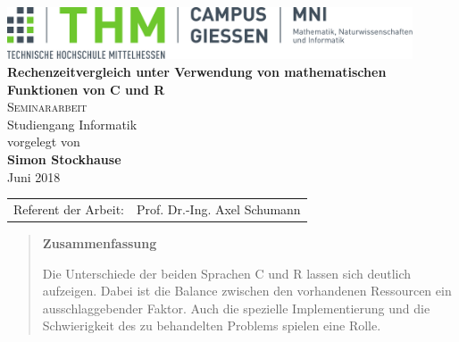 \documentclass[%
	BCOR=8.25mm,         %
	DIV=12,              %
	parskip=half,				 %
	bibliography=totoc,	 %
	headsepline=on,      %
	openany
	]{scrbook}
\begin{document}
\frontmatter

\begin{titlepage}
	\begin{center}
	\includegraphics[width=0.9\textwidth]{img/mni-logo}\\[5cm]
	\textbf{\huge\sffamily Rechenzeitvergleich unter Verwendung von mathematischen Funktionen von C und R}\\[2cm]
	\textsc{\Large Seminararbeit}\\Studiengang Informatik\\[2cm]
	vorgelegt von\\
	\textbf{Simon Stockhause}\\ [1.5cm] 
	Juni 2018
	\end{center}
	\vfill
	\begin{tabular}{ll}
		Referent der Arbeit: & Prof. Dr.-Ing. Axel Schumann\\ 
	\end{tabular}
\end{titlepage}
\cleardoubleemptypage

\pagestyle{empty}


\pagestyle{empty}
\begin{quote}
	\vspace*{4cm}

	\begin{center}
		\textbf{\Large\sffamily Zusammenfassung}
	\end{center}

	Die Unterschiede der beiden Sprachen C und R lassen sich deutlich aufzeigen. Dabei ist die Balance zwischen den vorhandenen Ressourcen ein ausschlaggebender Faktor. Auch die spezielle Implementierung und die Schwierigkeit des zu behandelten Problems spielen eine Rolle.

	
\end{quote}
\cleardoubleemptypage

\tableofcontents
\listoffigures

\mainmatter 
\pagestyle{headings}





\backmatter 

\appendix


\end{document}
